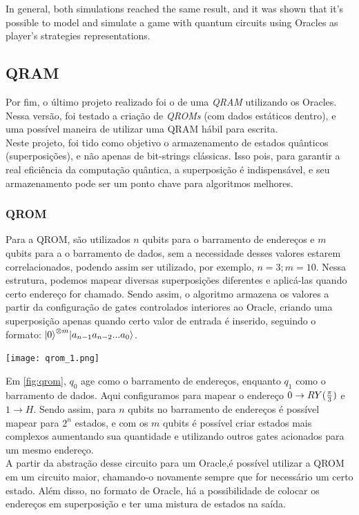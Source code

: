 \documentclass{article}
\begin{document}
In general, both simulations reached the same result, and it was shown that it's possible to model and simulate a game with quantum circuits using Oracles as player's strategies representations.

\subsection{QRAM} \label{qram}
Por fim, o último projeto realizado foi o de uma \emph{QRAM} utilizando os Oracles. Nessa versão, foi testado a criação de \emph{QROMs} (com dados estáticos dentro), e uma possível maneira de utilizar uma QRAM hábil para escrita.\\
Neste projeto, foi tido como objetivo o armazenamento de estados quânticos (superposições), e não apenas de bit-strings clássicas. Isso pois, para garantir a real eficiência da computação quântica, a superposição é indispensável, e seu armazenamento pode ser um ponto chave para algoritmos melhores.

\subsubsection{QROM}
Para a QROM, são utilizados $n$ qubits para o barramento de endereços e $m$ qubits para a o barramento de dados, sem a necessidade desses valores estarem correlacionados, podendo assim ser utilizado, por exemplo, $n=3; m=10$. Nessa estrutura, podemos mapear diversas superposições diferentes e aplicá-las quando certo endereço for chamado. Sendo assim, o algoritmo armazena os valores a partir da configuração de gates controlados interiores ao Oracle, criando uma superposição apenas quando certo valor de entrada é inserido, seguindo o formato: ${\ket{0}^{\otimes m}} {\ket{a_{n-1} a_{n-2} ... a_0}}$.

\begin{center}
	\texttt{[image: qrom\_1.png]}
	\label{fig:qrom}
\end{center}


Em \ref{fig:qrom}, $q_{0}$ age como o barramento de endereços, enquanto $q_{1}$ como o barramento de dados. Aqui configuramos para mapear o endereço $0 \to RY({\pi\over{3}})$ e $1 \to H$. Sendo assim, para $n$ qubits no barramento de endereços é possível mapear para $2^{n}$ estados, e com os $m$ qubits é possível criar estados mais complexos aumentando sua quantidade e utilizando outros gates acionados para um mesmo endereço. \\
A partir da abstração desse circuito para um Oracle,é possível utilizar a QROM em um circuito maior, chamando-o novamente sempre que for necessário um certo estado. Além disso, no formato de Oracle, há a possibilidade de colocar os endereços em superposição e ter uma mistura de estados na saída.
\end{document}
